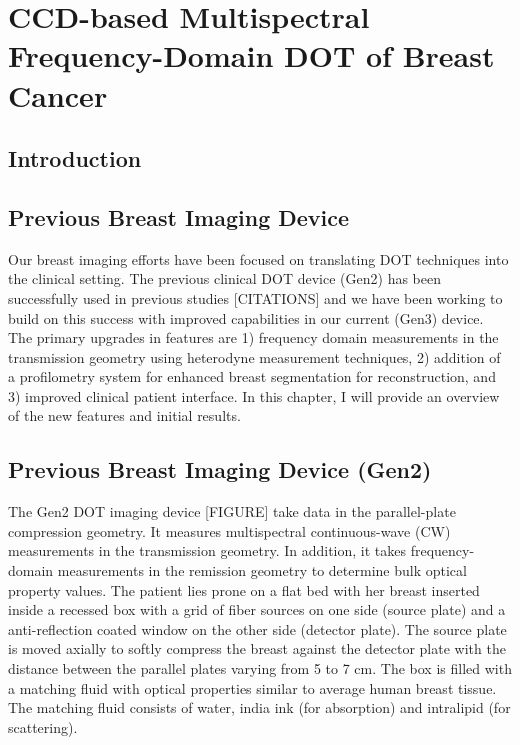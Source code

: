 \chapter{CCD-based Multispectral Frequency-Domain DOT of Breast Cancer}

\section{Introduction}


\section{Previous Breast Imaging Device}
Our breast imaging efforts have been focused on translating DOT techniques into the clinical setting. The previous clinical DOT device (Gen2)  has been successfully used in previous studies [CITATIONS] and we have been working to build on this success with improved capabilities in our current (Gen3) device. The primary upgrades in features are 1) frequency domain measurements in the transmission geometry using heterodyne measurement techniques, 2) addition of a profilometry system for enhanced breast segmentation for reconstruction, and 3) improved clinical patient interface. In this chapter, I will provide an overview of the new features and initial results.

\section{Previous Breast Imaging Device (Gen2)}
The Gen2 DOT imaging device [FIGURE] take data in the parallel-plate compression geometry. It measures multispectral continuous-wave (CW) measurements in the transmission geometry. In addition, it takes frequency-domain measurements in the remission geometry to determine bulk optical property values. The patient lies prone on a flat bed with her breast inserted inside a recessed box with a grid of fiber sources on one side (source plate) and a anti-reflection coated window on the other side (detector plate). The source plate is moved axially to softly compress the breast against the detector plate with the distance between the parallel plates varying from 5 to 7 cm. The box is filled with a matching fluid with optical properties similar to average human breast tissue. The matching fluid consists of water, india ink (for absorption) and intralipid (for scattering).

